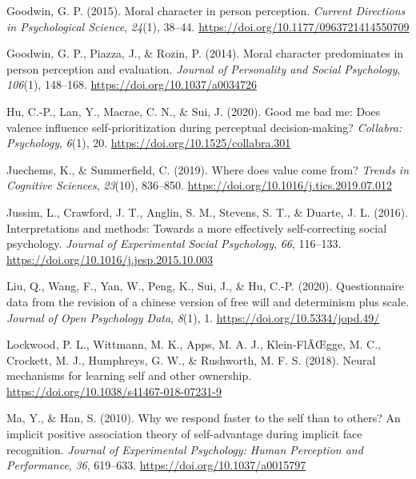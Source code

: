 \documentclass[
  man]{apa6}
\newlength{\cslhangindent}
\newlength{\cslentryspacingunit} %
\newenvironment{CSLReferences}[2] %
 {%
  \setlength{\parindent}{0pt}
  \ifodd #1
  \let\oldpar\par
  \def\par{\hangindent=\cslhangindent\oldpar}
  \fi
  \setlength{\parskip}{#2\cslentryspacingunit}
 }%
 {}
\begin{document}
\begin{CSLReferences}{1}{0}
\leavevmode{}%
Goodwin, G. P. (2015). Moral character in person perception. \emph{Current Directions in Psychological Science}, \emph{24}(1), 38--44. \url{https://doi.org/10.1177/0963721414550709}

\leavevmode{}%
Goodwin, G. P., Piazza, J., \& Rozin, P. (2014). Moral character predominates in person perception and evaluation. \emph{Journal of Personality and Social Psychology}, \emph{106}(1), 148--168. \url{https://doi.org/10.1037/a0034726}

\leavevmode{}%
Hu, C.-P., Lan, Y., Macrae, C. N., \& Sui, J. (2020). Good me bad me: Does valence influence self-prioritization during perceptual decision-making? \emph{Collabra: Psychology}, \emph{6}(1), 20. \url{https://doi.org/10.1525/collabra.301}

\leavevmode{}%
Juechems, K., \& Summerfield, C. (2019). Where does value come from? \emph{Trends in Cognitive Sciences}, \emph{23}(10), 836--850. \url{https://doi.org/10.1016/j.tics.2019.07.012}

\leavevmode{}%
Jussim, L., Crawford, J. T., Anglin, S. M., Stevens, S. T., \& Duarte, J. L. (2016). Interpretations and methods: {Towards} a more effectively self-correcting social psychology. \emph{Journal of Experimental Social Psychology}, \emph{66}, 116--133. \url{https://doi.org/10.1016/j.jesp.2015.10.003}

\leavevmode{}%
Liu, Q., Wang, F., Yan, W., Peng, K., Sui, J., \& Hu, C.-P. (2020). Questionnaire data from the revision of a chinese version of free will and determinism plus scale. \emph{Journal of Open Psychology Data}, \emph{8}(1), 1. \url{https://doi.org/10.5334/jopd.49/}

\leavevmode{}%
Lockwood, P. L., Wittmann, M. K., Apps, M. A. J., Klein-FlÃŒgge, M. C., Crockett, M. J., Humphreys, G. W., \& Rushworth, M. F. S. (2018). Neural mechanisms for learning self and other ownership. \url{https://doi.org/10.1038/s41467-018-07231-9}

\leavevmode{}%
Ma, Y., \& Han, S. (2010). Why we respond faster to the self than to others? {An} implicit positive association theory of self-advantage during implicit face recognition. \emph{Journal of Experimental Psychology: Human Perception and Performance}, \emph{36}, 619--633. \url{https://doi.org/10.1037/a0015797}


\end{CSLReferences}
\end{document}
